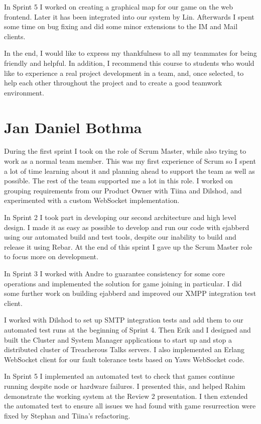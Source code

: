 \documentclass[11pt,a4paper]{report}
\begin{document}
In Sprint 5 I worked on creating a graphical map for our game on the web
frontend. Later it has been integrated into our system by Lin. Afterwards I
spent some time on bug fixing and did some minor extensions to the IM and Mail
clients.

In the end, I would like to express my thankfulness to all my teammates for
being friendly and helpful. In addition, I recommend this course to students
who would like to experience a real project development in a team, and, once
selected, to help each other throughout the project and to create a good
teamwork environment.

\section{Jan Daniel Bothma}
During the first sprint I took on the role of Scrum Master, while also trying to
work as a normal team member. This was my first experience of Scrum so I spent a
lot of time learning about it and planning ahead to support the team as well as
possible. The rest of the team supported me a lot in this role.
I worked on grouping requirements from our Product Owner with Tiina
and Dilshod, and experimented with a custom WebSocket implementation.

In Sprint 2 I took part in developing our second architecture and high level
design. I made it as easy as possible to develop and run our code with ejabberd
using our automated build and test tools, despite our inability to build and
release it using Rebar. At the end of this sprint I gave up the Scrum Master
role to focus more on development.

In Sprint 3 I worked with Andre to guarantee consistency for some core
operations and implemented the solution for game joining in particular. I did
some further work on building ejabberd and improved our XMPP integration test
client.

I worked with Dilshod to set up SMTP integration tests and add them to our
automated test runs at the beginning of Sprint 4. Then Erik and I designed and
built the Cluster and System Manager applications to start up and stop a
distributed cluster of Treacherous Talks servers. I also implemented an Erlang
WebSocket client for our fault tolerance tests based on Yaws WebSocket code.

In Sprint 5 I implemented an automated test to check that games continue running
despite node or hardware failures. I presented this, and helped Rahim
demonstrate the working system at the Review 2 presentation. I then extended the
automated test to ensure all issues we had found with game resurrection were
fixed by Stephan and Tiina's refactoring.
\end{document}

